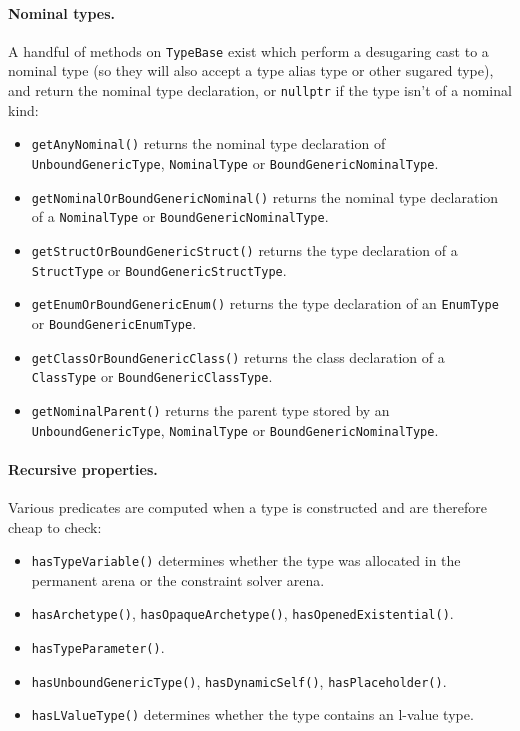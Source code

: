 \documentclass[../generics]{subfiles}
\begin{document}
\paragraph{Nominal types.} A handful of methods on \texttt{TypeBase} exist which perform a desugaring cast to a nominal type (so they will also accept a type alias type or other sugared type), and return the nominal type declaration, or \texttt{nullptr} if the type isn't of a nominal kind:
\begin{itemize}
\item \texttt{getAnyNominal()} returns the nominal type declaration of \texttt{UnboundGenericType}, \texttt{NominalType} or \texttt{BoundGenericNominalType}.
\item \texttt{getNominalOrBoundGenericNominal()} returns the nominal type declaration of a \texttt{NominalType} or \texttt{BoundGenericNominalType}.
\item \texttt{getStructOrBoundGenericStruct()} returns the type declaration of a \texttt{StructType} or \texttt{BoundGenericStructType}.
\item \texttt{getEnumOrBoundGenericEnum()} returns the type declaration of an \texttt{EnumType} or \texttt{BoundGenericEnumType}.
\item \texttt{getClassOrBoundGenericClass()} returns the class declaration of a \texttt{ClassType} or \texttt{BoundGenericClassType}.
\item \texttt{getNominalParent()} returns the parent type stored by an \texttt{UnboundGenericType}, \texttt{NominalType} or \texttt{BoundGenericNominalType}.
\end{itemize}

\paragraph{Recursive properties.} Various predicates are computed when a type is constructed and are therefore cheap to check:
\begin{itemize}
\item \texttt{hasTypeVariable()} determines whether the type was allocated in the permanent arena or the constraint solver arena.
\item \texttt{hasArchetype()}, \texttt{hasOpaqueArchetype()}, \texttt{hasOpenedExistential()}.
\item \texttt{hasTypeParameter()}.
\item \texttt{hasUnboundGenericType()}, \texttt{hasDynamicSelf()}, \texttt{hasPlaceholder()}.
\item \texttt{hasLValueType()} determines whether the type contains an l-value type.
\end{itemize}
\end{document}
